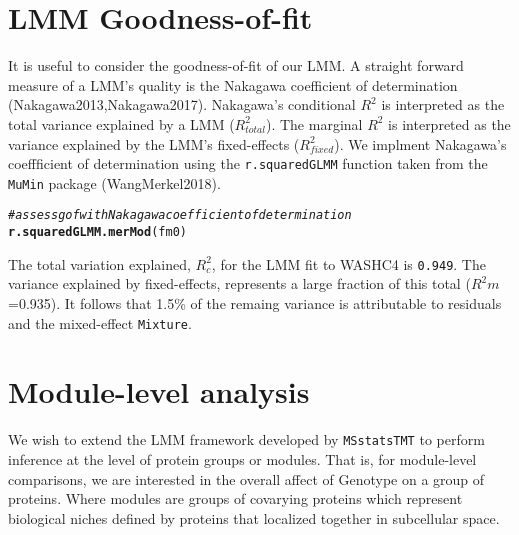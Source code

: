 \documentclass[11pt]{elife}\usepackage[]{graphicx}\usepackage[]{color}
\makeatletter
\newcommand{\hlcom}[1]{\textcolor[rgb]{0.678,0.584,0.686}{\textit{#1}}}%
\newcommand{\hlstd}[1]{\textcolor[rgb]{0.345,0.345,0.345}{#1}}%
\newcommand{\hlkwd}[1]{\textcolor[rgb]{0.737,0.353,0.396}{\textbf{#1}}}%
\newenvironment{kframe}{%
 \def\at@end@of@kframe{}%
 \ifinner\ifhmode%
  \def\at@end@of@kframe{\end{minipage}}%
  \begin{minipage}{\columnwidth}%
 \fi\fi%
 \def\FrameCommand##1{\hskip\@totalleftmargin \hskip-\fboxsep
 \colorbox{shadecolor}{##1}\hskip-\fboxsep
     \hskip-\linewidth \hskip-\@totalleftmargin \hskip\columnwidth}%
 \MakeFramed {\advance\hsize-\width
   \@totalleftmargin\z@ \linewidth\hsize
   \@setminipage}}%
 {\par\unskip\endMakeFramed%
 \at@end@of@kframe}
\newenvironment{knitrout}{}{} %
\makeatother
\begin{document}
\section{LMM Goodness-of-fit}

It is useful to consider the goodness-of-fit of our LMM. A straight forward
measure of a LMM's quality is the Nakagawa coefficient of 
determination (Nakagawa2013,Nakagawa2017). Nakagawa's conditional $R^2$ is 
interpreted as the total variance explained by a LMM ($R^2_{total}$).
The marginal $R^2$ is interpreted as the variance explained by the LMM's 
fixed-effects ($R^2_{fixed}$). We implment Nakagawa's coeffficient of 
determination using the \texttt{r.squaredGLMM} function taken from the 
\texttt{MuMin} package (WangMerkel2018).\\


\begin{knitrout}
\color{fgcolor}\begin{kframe}
\begin{alltt}
\hlcom{# assess gof with Nakagawa coefficient of determination}
\hlkwd{r.squaredGLMM.merMod}\hlstd{(fm0)}
\end{alltt}
\end{kframe}
\end{knitrout}


The total variation explained, $R^2_{c}$, for the LMM fit to WASHC4 is 
\texttt{0.949}. The variance explained by fixed-effects, represents a large
fraction of this total ($R^2{m}$=0.935). It follows that 1.5\% of the remaing
variance is attributable to residuals and the mixed-effect \texttt{Mixture}.\\


\section{Module-level analysis}

We wish to extend the LMM framework developed by \texttt{MSstatsTMT} to perform 
inference at the level of protein groups or modules.
That is, for module-level comparisons, we are interested in the overall affect 
of Genotype on a group of proteins. Where modules are groups of covarying 
proteins which represent biological niches defined by proteins that 
localized together in subcellular space.\\
\end{document}
